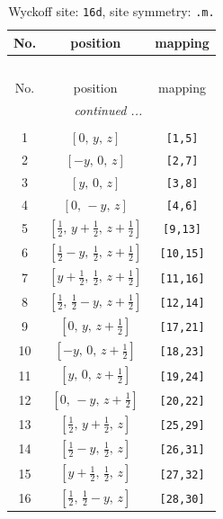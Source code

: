 \documentclass[fleqn,8pt]{jsarticle}
\begin{document}
\begin{longtable}{ccc}
\caption{Wyckoff site: {\tt 16d}, site symmetry: {\tt .m.}}
 \\
 \hline \hline
No. & position & mapping \\ \hline \endfirsthead

\multicolumn{2}{l}{\tablename\ \thetable{}} \\
 \hline \hline
No. & position & mapping \\ \hline \endhead

 \hline \hline
\multicolumn{2}{r}{\footnotesize\it continued ...} \\ \endfoot

 \hline \hline
\multicolumn{2}{r}{} \\ \endlastfoot

1 & $\left[ 0,\, y,\, z \right]$ & {\tt [1,5]} \\ \hline
2 & $\left[ - y,\, 0,\, z \right]$ & {\tt [2,7]} \\ \hline
3 & $\left[ y,\, 0,\, z \right]$ & {\tt [3,8]} \\ \hline
4 & $\left[ 0,\, - y,\, z \right]$ & {\tt [4,6]} \\ \hline
5 & $\left[ \frac{1}{2},\, y + \frac{1}{2},\, z + \frac{1}{2} \right]$ & {\tt [9,13]} \\ \hline
6 & $\left[ \frac{1}{2} - y,\, \frac{1}{2},\, z + \frac{1}{2} \right]$ & {\tt [10,15]} \\ \hline
7 & $\left[ y + \frac{1}{2},\, \frac{1}{2},\, z + \frac{1}{2} \right]$ & {\tt [11,16]} \\ \hline
8 & $\left[ \frac{1}{2},\, \frac{1}{2} - y,\, z + \frac{1}{2} \right]$ & {\tt [12,14]} \\ \hline
9 & $\left[ 0,\, y,\, z + \frac{1}{2} \right]$ & {\tt [17,21]} \\ \hline
10 & $\left[ - y,\, 0,\, z + \frac{1}{2} \right]$ & {\tt [18,23]} \\ \hline
11 & $\left[ y,\, 0,\, z + \frac{1}{2} \right]$ & {\tt [19,24]} \\ \hline
12 & $\left[ 0,\, - y,\, z + \frac{1}{2} \right]$ & {\tt [20,22]} \\ \hline
13 & $\left[ \frac{1}{2},\, y + \frac{1}{2},\, z \right]$ & {\tt [25,29]} \\ \hline
14 & $\left[ \frac{1}{2} - y,\, \frac{1}{2},\, z \right]$ & {\tt [26,31]} \\ \hline
15 & $\left[ y + \frac{1}{2},\, \frac{1}{2},\, z \right]$ & {\tt [27,32]} \\ \hline
16 & $\left[ \frac{1}{2},\, \frac{1}{2} - y,\, z \right]$ & {\tt [28,30]} \\
\end{longtable}
\end{document}
